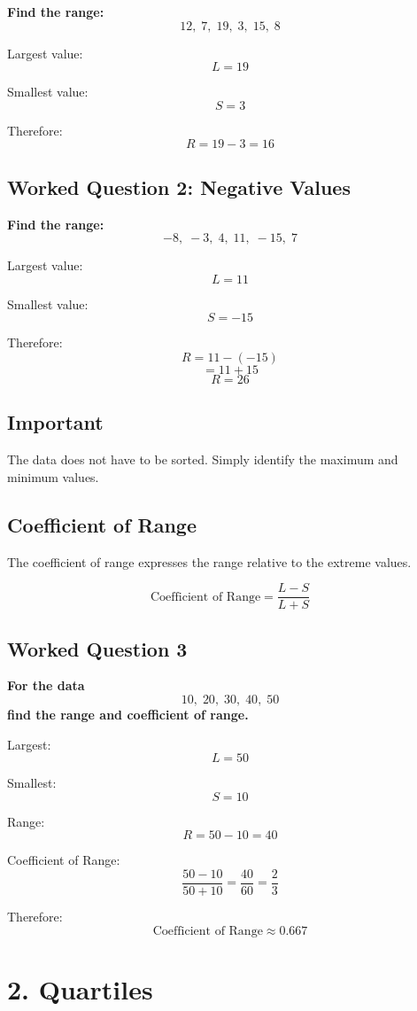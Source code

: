 \documentclass[12pt,a4paper]{article}
\newcommand{\boxformula}[1]{%
\[
\boxed{\displaystyle #1}
\]
}
\begin{document}
\textbf{Find the range:}
\[
12,\;7,\;19,\;3,\;15,\;8
\]

Largest value:
\[
L=19
\]

Smallest value:
\[
S=3
\]

Therefore:
\[
R=19-3=\boxed{16}
\]

\subsection*{Worked Question 2: Negative Values}

\textbf{Find the range:}
\[
-8,\;-3,\;4,\;11,\;-15,\;7
\]

Largest value:
\[
L=11
\]

Smallest value:
\[
S=-15
\]

Therefore:
\[
R=11-(-15)
\]
\[
=11+15
\]
\[
\boxed{R=26}
\]

\subsection*{Important}

The data does not have to be sorted. Simply identify the maximum and minimum values.

\subsection{Coefficient of Range}

The coefficient of range expresses the range relative to the extreme values.

\boxformula{
\text{Coefficient of Range}
=
\frac{L-S}{L+S}
}

\subsection*{Worked Question 3}

\textbf{For the data}
\[
10,\;20,\;30,\;40,\;50
\]
\textbf{find the range and coefficient of range.}

Largest:
\[
L=50
\]

Smallest:
\[
S=10
\]

Range:
\[
R=50-10=\boxed{40}
\]

Coefficient of Range:
\[
\frac{50-10}{50+10}
=
\frac{40}{60}
=
\frac{2}{3}
\]

Therefore:
\[
\boxed{\text{Coefficient of Range}\approx0.667}
\]

\section{2. Quartiles}
\end{document}
